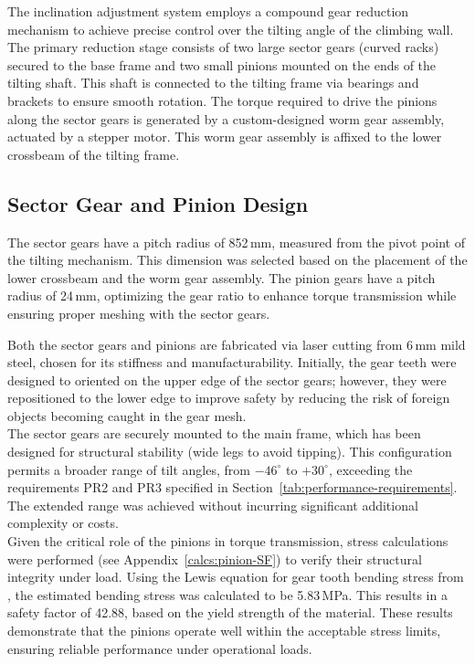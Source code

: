 The inclination adjustment system employs a compound gear reduction mechanism to achieve precise control over the tilting angle of the climbing wall. The primary reduction stage consists of two large sector gears (curved racks) secured to the base frame and two small pinions mounted on the ends of the tilting shaft. This shaft is connected to the tilting frame via bearings and brackets to ensure smooth rotation. The torque required to drive the pinions along the sector gears is generated by a custom-designed worm gear assembly, actuated by a stepper motor. This worm gear assembly is affixed to the lower crossbeam of the tilting frame.

\subsection{Sector Gear and Pinion Design}

The sector gears have a pitch radius of 852\,mm, measured from the pivot point of the tilting mechanism. This dimension was selected based on the placement of the lower crossbeam and the worm gear assembly. The pinion gears have a pitch radius of 24\,mm, optimizing the gear ratio to enhance torque transmission while ensuring proper meshing with the sector gears.

Both the sector gears and pinions are fabricated via laser cutting from 6\,mm mild steel, chosen for its stiffness and manufacturability. Initially, the gear teeth were designed to oriented on the upper edge of the sector gears; however, they were repositioned to the lower edge to improve safety by reducing the risk of foreign objects becoming caught in the gear mesh.\\

The sector gears are securely mounted to the main frame, which has been designed for structural stability (wide legs to avoid tipping). This configuration permits a broader range of tilt angles, from $-46^\circ$ to $+30^\circ$, exceeding the requirements PR2 and PR3 specified in Section~\ref{tab:performance-requirements}. The extended range was achieved without incurring significant additional complexity or costs.\\

Given the critical role of the pinions in torque transmission, stress calculations were performed (see Appendix~\ref{calcs:pinion-SF}) to verify their structural integrity under load. Using the Lewis equation for gear tooth bending stress from \cite{budynas2015shigley}, the estimated bending stress was calculated to be 5.83\,MPa. This results in a safety factor of 42.88, based on the yield strength of the material. These results demonstrate that the pinions operate well within the acceptable stress limits, ensuring reliable performance under operational loads.

